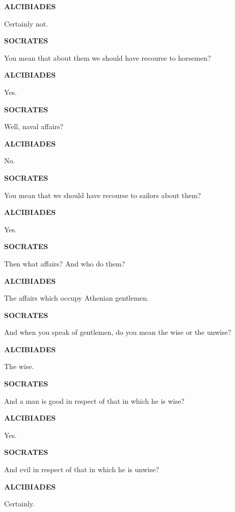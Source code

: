 \documentclass[11pt,letter]{article}
\begin{document}
\par \textbf{ALCIBIADES}
\par   Certainly not.

\par \textbf{SOCRATES}
\par   You mean that about them we should have recourse to horsemen?

\par \textbf{ALCIBIADES}
\par   Yes.

\par \textbf{SOCRATES}
\par   Well, naval affairs?

\par \textbf{ALCIBIADES}
\par   No.

\par \textbf{SOCRATES}
\par   You mean that we should have recourse to sailors about them?

\par \textbf{ALCIBIADES}
\par   Yes.

\par \textbf{SOCRATES}
\par   Then what affairs? And who do them?

\par \textbf{ALCIBIADES}
\par   The affairs which occupy Athenian gentlemen.

\par \textbf{SOCRATES}
\par   And when you speak of gentlemen, do you mean the wise or the unwise?

\par \textbf{ALCIBIADES}
\par   The wise.

\par \textbf{SOCRATES}
\par   And a man is good in respect of that in which he is wise?

\par \textbf{ALCIBIADES}
\par   Yes.

\par \textbf{SOCRATES}
\par   And evil in respect of that in which he is unwise?

\par \textbf{ALCIBIADES}
\par   Certainly.
\end{document}
